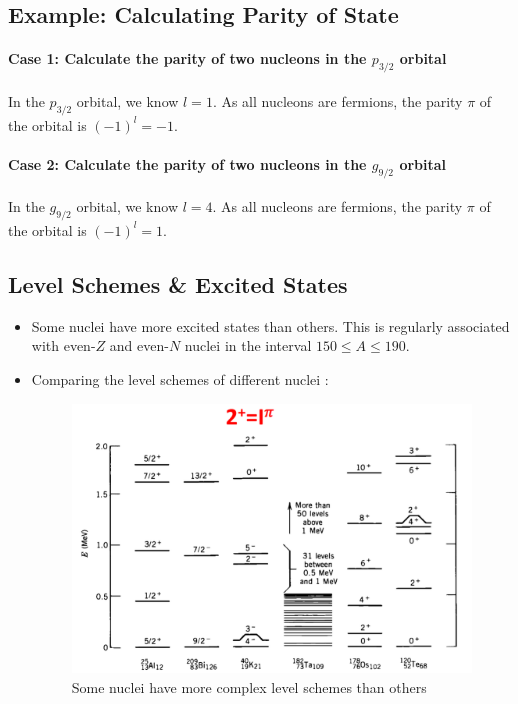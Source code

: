 \documentclass{article}
\begin{document}
\subsection{Example: Calculating Parity of State}
\paragraph{Case 1: Calculate the parity of two nucleons in the $p_{3 /2}$ orbital} 
In the $p_{3 /2}$ orbital, we know $l = 1$. As all nucleons are fermions, the parity $π$ of the orbital is $(-1)^l = -1$.
\paragraph{Case 2: Calculate the parity of two nucleons in the $g_{9 /2}$ orbital}
In the $g_{9 /2}$ orbital, we know $l = 4$. As all nucleons are fermions, the parity $π$ of the orbital is $(-1)^l = 1$.

\subsection{Level Schemes \& Excited States}
\begin{itemize}
    \item Some nuclei have more excited states than others. This is regularly associated with even-$Z$ and even-$N$ nuclei in the interval $150 ≤ A ≤ 190$. 
    \item Comparing the level schemes of different nuclei : 
    \begin{figure}[h!]
    \centering
    \includegraphics[width = .75\textwidth]{nuclei_excitation_levels_comparison.png}
    \caption{Some nuclei have more complex level schemes than others}
    \label{fig: nuclei_excitation_levels_comparison}
    \end{figure}
    
\end{itemize}
\end{document}
